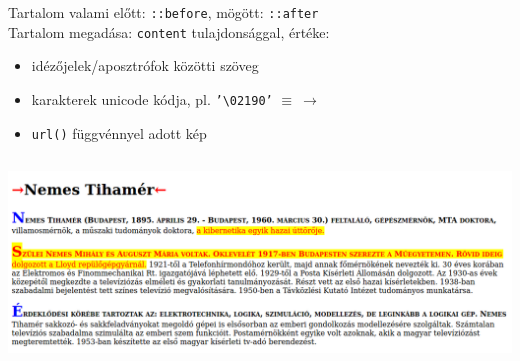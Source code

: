 \begin{frame}
  Tartalom valami előtt: \texttt{::before}, mögött: \texttt{::after}\\
  \vfill
  Tartalom megadása: \texttt{content} tulajdonsággal, értéke:
  \begin{itemize}
    \item idézőjelek/aposztrófok közötti szöveg
    \item karakterek unicode kódja, pl. \texttt{'\textbackslash 02190'} $\equiv ~ \to$
    \item \texttt{url()} függvénnyel adott kép
  \end{itemize}
\end{frame}

\begin{frame}
  \begin{columns}[T]
      \begin{exampleblock}{}
        \fontsize{7}{8} \selectfont
        
      \end{exampleblock}
      \begin{exampleblock}{}
        \fontsize{7}{8} \selectfont
        
      \end{exampleblock}
  \end{columns}
  \begin{exampleblock}{}
    \fontsize{7}{8} \selectfont
    \vspace{-0.1cm}
    
    \vspace{-0.1cm}
  \end{exampleblock}
\end{frame}

\begin{frame}
  \begin{center}
    \includegraphics[width=\textwidth]{pseudoelements.png}\\
  \end{center}
\end{frame}

